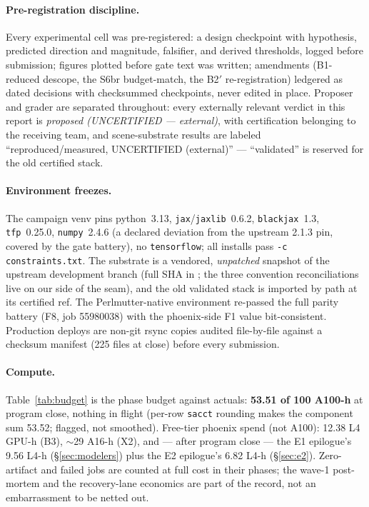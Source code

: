 \paragraph{Pre-registration discipline.} Every experimental cell was
pre-registered: a design checkpoint with hypothesis, predicted direction
and magnitude, falsifier, and derived thresholds, logged before
submission; figures plotted before gate text was written; amendments
(B1-reduced descope, the S6br budget-match, the B2$'$ re-registration)
ledgered as dated decisions with checksummed checkpoints, never edited in
place. Proposer and grader are separated throughout: every externally
relevant verdict in this report is {\it proposed (UNCERTIFIED ---
external)}, with certification belonging to the receiving team, and
scene-substrate results are labeled ``reproduced/measured, UNCERTIFIED
(external)'' --- ``validated'' is reserved for the old certified stack.

\paragraph{Environment freezes.} The campaign venv pins
python~3.13, \texttt{jax}/\texttt{jaxlib}~0.6.2, \texttt{blackjax}~1.3,
\texttt{tfp}~0.25.0, \texttt{numpy}~2.4.6 (a declared deviation from the
upstream 2.1.3 pin, covered by the gate battery), no
\texttt{tensorflow}; all installs pass \texttt{-c constraints.txt}. The
substrate is a vendored, {\it unpatched} snapshot of the upstream
development branch (full SHA in ; the three
convention reconciliations live on our side of the seam), and the old
validated stack is imported by path at its certified ref. The
Perlmutter-native environment re-passed the full parity battery (F8, job
55980038) with the phoenix-side F1 value bit-consistent. Production
deploys are non-git rsync copies audited file-by-file against a checksum
manifest (225 files at close) before every submission.

\paragraph{Compute.} Table~\ref{tab:budget} is the phase budget against
actuals: {\bf 53.51 of 100 A100-h} at program close, nothing in flight
(per-row \texttt{sacct} rounding makes the component sum 53.52; flagged,
not smoothed). Free-tier phoenix spend (not A100): 12.38 L4 GPU-h (B3),
$\sim$29 A16-h (X2), and --- after program close --- the E1 epilogue's
9.56 L4-h (\S\ref{sec:modelers}) plus the E2 epilogue's 6.82 L4-h
(\S\ref{sec:e2}). Zero-artifact and failed jobs are counted at
full cost in their phases; the wave-1 post-mortem and the recovery-lane
economics are part of the record, not an embarrassment to be netted out.

